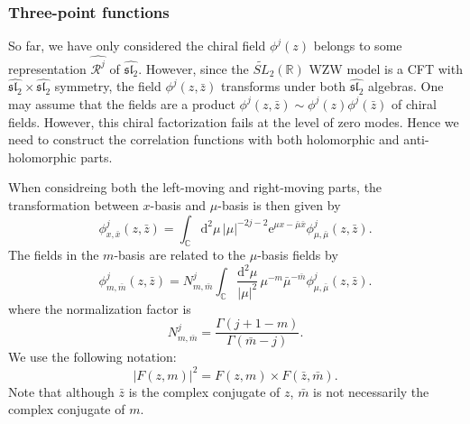 \documentclass[10pt,a4paper]{article}
\numberwithin{equation}{section}
\begin{document}
\subsubsection*{Three-point functions}
So far, we have only considered the chiral field $\phi^{j}(z)$ belongs to some representation $\widehat{\mathcal{R}^{j}}$ of 
$\widehat{\mathfrak{sl}_{2}}$. However, since the $\widetilde{SL}_{2}(\mathbb{R})$ WZW model is a CFT with $\widehat{\mathfrak{sl}_{2}}\times\widehat{\mathfrak{sl}_{2}}$ 
symmetry, the field $\phi^{j}(z,\bar{z})$ transforms under both $\widehat{\mathfrak{sl}_{2}}$ algebras. One may assume that 
the fields are a product $\phi^{j}(z,\bar{z}) \sim \phi^{j}(z)\phi^{j}(\bar{z})$ of chiral fields. However, this chiral 
factorization fails at the level of zero modes. Hence we need to construct the correlation functions with both holomorphic and anti-holomorphic 
parts.

When considreing both the left-moving and right-moving parts, the transformation between $x$-basis and $\mu$-basis is then given by 
\begin{equation}
    \phi^{j}_{x,\bar{x}}(z,\bar{z}) = \int_{\mathbb{C}} \mathrm{d}^{2} \mu \, |\mu|^{-2j-2} \mathrm{e}^{\mu x - \bar{\mu} \bar{x}} \phi^{j}_{\mu,\bar{\mu}}(z,\bar{z}).
\end{equation}
The fields in the $m$-basis are related to the $\mu$-basis fields by 
\begin{equation}
    \phi^{j}_{m,\bar{m}}(z,\bar{z}) = N^{j}_{m,\bar{m}} \int_{\mathbb{C}} \frac{\mathrm{d}^{2} \mu }{|\mu|^{2}} \, \mu^{-m} \bar{\mu}^{-\bar{m}} \phi^{j}_{\mu,\bar{\mu}} (z,\bar{z}).
\end{equation}
where the normalization factor is 
\begin{equation}
    N^{j}_{m,\bar{m}} = \frac{\Gamma(j+1-m)}{\Gamma(\bar{m} - j)}.
\end{equation} 
We use the following notation:
\begin{equation}
    \left| F(z,m) \right|^{2} = F(z,m) \times F(\bar{z},\bar{m}).
\end{equation}
Note that although $\bar{z}$ is the complex conjugate of $z$, $\bar{m}$ is not necessarily the complex conjugate of $m$. 
\end{document}

